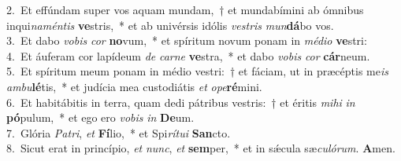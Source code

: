 {2.~}Et effúndam super vos aquam mundam,~† et mundabímini ab ómnibus inqui\textit{na}\textit{mén}\textit{tis} \textbf{ve}stris,~* et ab univérsis idólis \textit{ve}\textit{stris} \textit{mun}\textbf{dá}bo vos.\\
{3.~}Et dabo \textit{vo}\textit{bis} \textit{cor} \textbf{no}vum,~* et spíritum novum ponam in \textit{mé}\textit{di}\textit{o} \textbf{ve}stri:\\
{4.~}Et áuferam cor lapídeum \textit{de} \textit{car}\textit{ne} \textbf{ve}stra,~* et dabo \textit{vo}\textit{bis} \textit{cor} \textbf{cár}neum.\\
{5.~}Et spíritum meum ponam in médio vestri:~† et fáciam, ut in præcéptis me\textit{is} \textit{am}\textit{bu}\textbf{lé}tis,~* et judícia mea custodiátis \textit{et} \textit{o}\textit{pe}\textbf{ré}mini.\\
{6.~}Et habitábitis in terra, quam dedi pátribus vestris:~† et éritis \textit{mi}\textit{hi} \textit{in} \textbf{pó}pulum,~* et ego ero \textit{vo}\textit{bis} \textit{in} \textbf{De}um.\\
{7.~}Glória \textit{Pa}\textit{tri}, \textit{et} \textbf{Fí}lio,~* et Spi\textit{rí}\textit{tu}\textit{i} \textbf{San}cto.\\
{8.~}Sicut erat in princípio, \textit{et} \textit{nunc}, \textit{et} \textbf{sem}per,~* et in sǽcula sæ\textit{cu}\textit{ló}\textit{rum}. \textbf{A}men.\\
